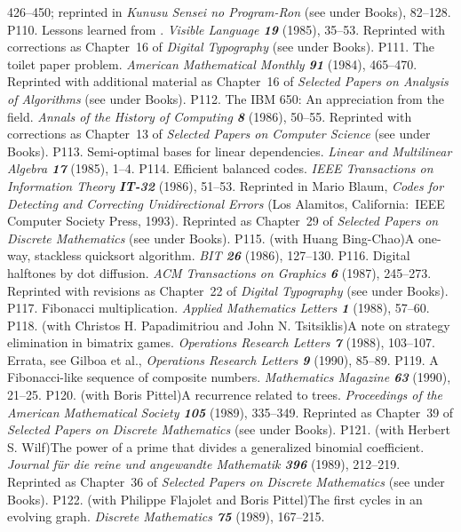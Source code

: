  426--450; reprinted in {\sl Kunusu Sensei no Program-Ron\/}
 (see under Books), 82--128.
\p P110. Lessons learned from \MF. {\sl Visible Language\/ \bf 19} (1985),
 35--53.
 Reprinted with corrections as Chapter~16 of {\sl Digital Typography\/}
 (see under Books).
\p P111. The toilet paper problem. {\sl American Mathematical Monthly\/
 \bf 91} (1984), 465--470.
 Reprinted with additional material as Chapter~16 of {\sl Selected Papers
 on Analysis of Algorithms\/} (see under Books).
\p P112. The IBM 650: An appreciation from the field. {\sl Annals
 of the History of Computing\/ \bf 8} (1986), 50--55.
 Reprinted with corrections as Chapter~13 of {\sl Selected Papers on
 Computer Science\/} (see under Books).
\p P113. Semi-optimal bases for linear dependencies. {\sl Linear
 and Multilinear Algebra\/ \bf 17} (1985), 1--4.
\p P114. Efficient balanced codes. {\sl IEEE Transactions
 on Information Theory\/ \bf IT-32} (1986), 51--53.
 Reprinted in Mario Blaum, {\sl Codes for Detecting and Correcting
 Unidirectional Errors\/} (Los Alamitos, California:\ IEEE Computer
 Society Press, 1993).
 Reprinted as Chapter~29 of {\sl Selected Papers on
 Discrete Mathematics\/} (see under Books).
\p P115. (with Huang Bing-Chao)\xskip A one-way, stackless quicksort
 algorithm. {\sl BIT\/ \bf 26} (1986), 127--130.
\p P116. Digital halftones by dot diffusion. {\sl ACM Transactions on
 Graphics\/ \bf 6} (1987), 245--273.
 Reprinted with revisions as Chapter~22 of {\sl Digital Typography\/}
 (see under Books).
\p P117. Fibonacci multiplication. {\sl Applied Mathematics Letters\/ \bf1}
 (1988), 57--60.
\p *P118. (with Christos H. Papadimitriou and John N. Tsitsiklis)\xskip A note
 on strategy elimination in bimatrix games. {\sl Operations Research Letters\/
 \bf7} (1988), 103--107. Errata, see Gilboa et al., {\sl Operations
 Research Letters\/ \bf9} (1990), 85--89.
\p P119. A Fibonacci-like sequence of composite numbers. {\sl Mathematics
 Magazine\/ \bf63} (1990), 21--25.
\p P120. (with Boris Pittel)\xskip A recurrence related to trees.
 {\sl Proceedings of the American Mathematical Society\/ \bf105} (1989),
 335--349.
 Reprinted as Chapter~39 of {\sl Selected Papers on
 Discrete Mathematics\/} (see under Books).
\p P121. (with Herbert S. Wilf)\xskip The power of a prime that divides a
 generalized binomial coefficient. {\sl Journal f\"ur die reine und angewandte
 Mathematik\/ \bf396} (1989), 212--219.
 Reprinted as Chapter~36 of {\sl Selected Papers on
 Discrete Mathematics\/} (see under Books).
\p P122. (with Philippe Flajolet and Boris Pittel)\xskip The first cycles in
 an evolving graph. {\sl Discrete Mathematics\/ \bf75} (1989), 167--215.
